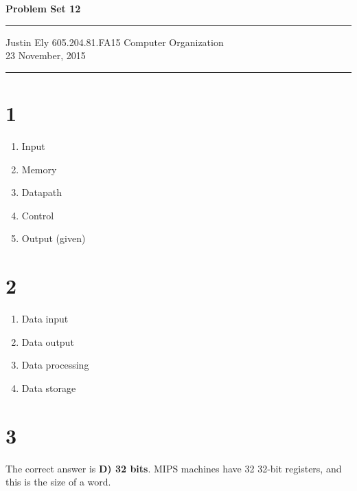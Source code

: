 \documentclass[a4paper,11pt]{article}
\begin{document}
\begin{flushright}

\vspace{1.1cm}

{\bf\Huge Problem Set 12}

\rule{0.25\linewidth}{0.5pt}

\vspace{0.5cm}
Justin Ely
\linebreak
\newline
\footnotesize{605.204.81.FA15 Computer Organization\\}
\vspace{0.5cm}
23 November, 2015
\end{flushright}

\noindent\rule{\linewidth}{1.0pt}



\section*{1}

\begin{enumerate}
    \item Input
    \item Memory
    \item Datapath
    \item Control
    \item Output (given)
\end{enumerate}


\section*{2}
\begin{enumerate}
    \item Data input
    \item Data output
    \item Data processing
    \item Data storage
\end{enumerate}



\section*{3}
The correct answer is {\bf D) 32 bits}.  MIPS machines have 32 32-bit registers, and this is the size of a word.
\end{document}
